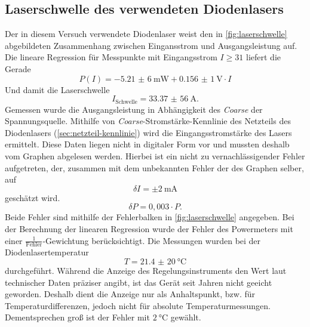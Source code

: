 \documentclass[../bericht.tex]{subfiles}
\begin{document}
      \subsection{Laserschwelle des verwendeten Diodenlasers}
      \label{subsec:laserschwelle}

        Der in diesem Versuch verwendete Diodenlaser weist den in \cref{fig:laserschwelle} abgebildeten Zusammenhang zwischen Eingansstrom und Ausgangsleistung auf. Die lineare Regression f\"ur Messpunkte mit Eingangsstrom $I\ge 31$ liefert die Gerade
        \begin{equation}
          P(I)=-\SI{5,21(6)}{\milli\watt} + \SI{0,156(1)}{\volt}\cdot I
          \label{eq:laserschwellen-plot}
        \end{equation}
        Und damit die Laserschwelle
        \begin{equation}
          I_\mathrm{Schwelle}=\SI{33,37(56)}{\ampere}.
          \label{eq:laserschwelle}
        \end{equation}
        Gemessen wurde die Ausgangsleistung in Abh\"angigkeit des \textit{Coarse} der Spannungsquelle. Mithilfe von \textit{Coarse}-Stromst\"arke-Kennlinie des Netzteils des Diodenlasers (\cref{sec:netzteil-kennlinie}) wird die Eingangsstromst\"arke des Lasers ermittelt. Diese Daten liegen nicht in digitaler Form vor und mussten deshalb vom Graphen abgelesen werden. Hierbei ist ein nicht zu vernachl\"assigender Fehler aufgetreten, der, zusammen mit dem unbekannten Fehler der des Graphen selber, auf
        \begin{equation*}
          \delta I = \pm \SI{2}{\milli\ampere}
        \end{equation*}
        gesch\"atzt wird.
        \begin{equation*}
          \delta P = 0,003 \cdot P.
        \end{equation*}
        Beide Fehler sind mithilfe der Fehlerbalken in \cref{fig:laserschwelle} angegeben. Bei der Berechnung der linearen Regression wurde der Fehler des Powermeters mit einer $\frac{1}{\mathrm{Fehler}}$-Gewichtung ber\"ucksichtigt. Die Messungen wurden bei der Diodenlasertemperatur
        \begin{equation*}
          T=\SI{21,4(20)}{\celsius}
        \end{equation*}
        durchgef\"uhrt. W\"ahrend die Anzeige des Regelungsinstruments den Wert laut technischer Daten pr\"aziser angibt, ist das Ger\"at seit Jahren nicht geeicht geworden. Deshalb dient die Anzeige nur als Anhaltspunkt, bzw. f\"ur Temperaturdifferenzen, jedoch nicht f\"ur absolute Temperaturmessungen. Dementsprechen gro\ss{} ist der Fehler mit $\SI{2}{\celsius}$  gew\"ahlt.
\end{document}
